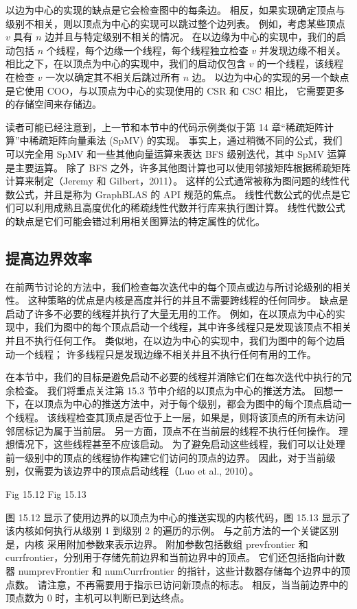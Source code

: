 以边为中心的实现的缺点是它会检查图中的每条边。 相反，如果实现确定顶点与级别不相关，则以顶点为中心的实现可以跳过整个边列表。 
例如，考虑某些顶点 $v$ 具有 $n$ 边并且与特定级别不相关的情况。 
在以边缘为中心的实现中，我们的启动包括 $n$ 个线程，每个边缘一个线程，每个线程独立检查 $v$ 并发现边缘不相关。 
相比之下，在以顶点为中心的实现中，我们的启动仅包含 $v$ 的一个线程，该线程在检查 $v$ 一次以确定其不相关后跳过所有 $n$ 边。 
以边为中心的实现的另一个缺点是它使用 $\mathrm{COO}$，与以顶点为中心的实现使用的 CSR 和 CSC 相比，
它需要更多的存储空间来存储边。

读者可能已经注意到，上一节和本节中的代码示例类似于第 14 章“稀疏矩阵计算”中稀疏矩阵向量乘法 (SpMV) 的实现。 
事实上，通过稍微不同的公式，我们可以完全用 SpMV 和一些其他向量运算来表达 BFS 级别迭代，其中 SpMV 运算是主要运算。 
除了 BFS 之外，许多其他图计算也可以使用邻接矩阵根据稀疏矩阵计算来制定（Jeremy 和 Gilbert，2011）。 
这样的公式通常被称为图问题的线性代数公式，并且是称为 GraphBLAS 的 API 规范的焦点。 
线性代数公式的优点是它们可以利用成熟且高度优化的稀疏线性代数并行库来执行图计算。 
线性代数公式的缺点是它们可能会错过利用相关图算法的特定属性的优化。

\subsection{提高边界效率}
在前两节讨论的方法中，我们检查每次迭代中的每个顶点或边与所讨论级别的相关性。 
这种策略的优点是内核是高度并行的并且不需要跨线程的任何同步。 缺点是启动了许多不必要的线程并执行了大量无用的工作。 
例如，在以顶点为中心的实现中，我们为图中的每个顶点启动一个线程，其中许多线程只是发现该顶点不相关并且不执行任何工作。 
类似地，在以边为中心的实现中，我们为图中的每个边启动一个线程； 许多线程只是发现边缘不相关并且不执行任何有用的工作。

在本节中，我们的目标是避免启动不必要的线程并消除它们在每次迭代中执行的冗余检查。 
我们将重点关注第 15.3 节中介绍的以顶点为中心的推送方法。 
回想一下，在以顶点为中心的推送方法中，对于每个级别，都会为图中的每个顶点启动一个线程。 
该线程检查其顶点是否位于上一层，如果是，则将该顶点的所有未访问邻居标记为属于当前层。 
另一方面，顶点不在当前层的线程不执行任何操作。 理想情况下，这些线程甚至不应该启动。 
为了避免启动这些线程，我们可以让处理前一级别中的顶点的线程协作构建它们访问的顶点的边界。 
因此，对于当前级别，仅需要为该边界中的顶点启动线程（Luo et al., 2010）。

{\color{red} Fig 15.12}
{\color{red} Fig 15.13}

图 15.12 显示了使用边界的以顶点为中心的推送实现的内核代码，图 15.13 显示了该内核如何执行从级别 1 到级别 2 的遍历的示例。
与之前方法的一个关键区别是，内核 采用附加参数来表示边界。 
附加参数包括数组 prevfrontier 和 currfrontier，分别用于存储先前边界和当前边界中的顶点。 
它们还包括指向计数器 numprevFrontier 和 numCurrfrontier 的指针，这些计数器存储每个边界中的顶点数。 
请注意，不再需要用于指示已访问新顶点的标志。 相反，当当前边界中的顶点数为 0 时，主机可以判断已到达终点。

